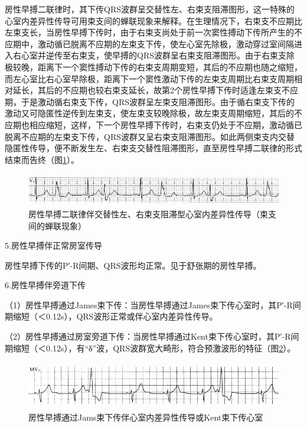 房性早搏二联律时，其下传QRS波群呈交替性左、右束支阻滞图形，这一特殊的心室内差异性传导可用束支间的蝉联现象来解释。在生理情况下，右束支不应期比左束支长，当房性早搏下传时，由于右束支尚处于前一次窦性搏动下传所产生的不应期中，激动循已脱离不应期的左束支下传，使左心室先除极，激动穿过室间隔进入右心室并逆传至右束支，使早搏的QRS波群呈右束支阻滞图形。由于右束支除极较晚，距离下一个窦性搏动下传的右束支周期变短，其后的不应期也随之缩短，而左心室比右心室早除极，距离下一个窦性激动下传的左束支周期比右束支周期相对延长，其后的不应期也较右束支延长，故第2个房性早搏下传时适逢左束支不应期，于是激动循右束支下传，QRS波群呈左束支阻滞图形。由于循右束支下传的激动又可隐匿性逆传到左束支，使左束支较晚除极，故左束支周期缩短，其后的不应期也相应缩短，这样，下一个房性早搏下传时，右束支仍处于不应期，激动循已脱离不应期的左束支下传，QRS波群又呈右束支阻滞图形。如此两侧束支内交替隐匿性传导，便不断发生左、右束支交替性阻滞图形，直至房性早搏二联律的形式结束而告终（图\ref{fig11-9}）。

\begin{figure}[!htbp]
 \centering
 \includegraphics[width=5.58333in,height=0.5625in]{./images/Image00161.jpg}
 \captionsetup{justification=centering}
 \caption{房性早搏二联律伴交替性左、右束支阻滞型心室内差异性传导（束支间的蝉联现象）}
 \label{fig11-9}
  \end{figure} 

5.房性早搏伴正常房室传导

房性早搏下传的P′-R间期、QRS波形均正常。见于舒张期的房性早搏。

6.房性早搏伴旁道下传

（1）房性早搏通过James束下传：当房性早搏通过James束下传心室时，其P′-R间期缩短（＜0.12s），QRS波形正常或伴心室内差异性传导。

（2）房性早搏通过房室旁道下传：当房性早搏通过Kent束下传心室时，其P′-R间期缩短（＜0.12s），有“δ”波，QRS波群宽大畸形，符合预激波形的特征（图\ref{fig11-10}）。

\begin{figure}[!htbp]
 \centering
 \includegraphics[width=5.58333in,height=0.82292in]{./images/Image00162.jpg}
 \captionsetup{justification=centering}
 \caption{房性早搏通过Jams束下传伴心室内差异性传导或Kent束下传心室}
 \label{fig11-10}
  \end{figure} 

